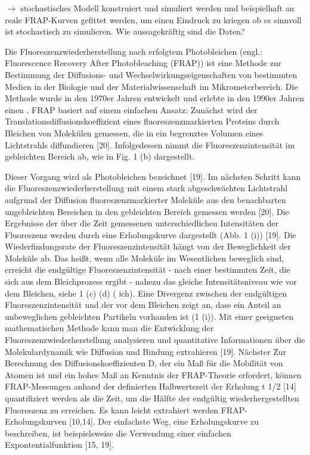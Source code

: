 $\rightarrow$ stochastisches Modell konstruiert und simuliert werden und beispielhaft an reale FRAP-Kurven gefittet werden, um einen Eindruck zu kriegen ob es sinnvoll ist stochastisch zu simulieren. Wie aussagekräftig sind die Daten?
\newline
\par
Die Fluoreszenzwiederherstellung nach erfolgtem Photobleichen (engl.: Fluorescence Recovery After Photobleaching (FRAP)) ist
eine Methode zur Bestimmung der Diffusions- und Wechselwirkungseigenschaften von bestimmten Medien in der Biologie und
der Materialwissenschaft im Mikrometerbereich.
Die Methode wurde in den 1970er Jahren entwickelt und erlebte in den 1990er Jahren einen .
FRAP basiert auf einem einfachen Ansatz:
Zunächst wird der Translationsdiffusionskoeffizient eines fluoreszenzmarkierten Proteins durch Bleichen von Molekülen gemessen,
die in ein begrenztes Volumen eines Lichtstrahls diffundieren [20]. Infolgedessen nimmt die Fluoreszenzintensität im gebleichten
Bereich ab, wie in Fig. 1 (b) dargestellt.\par
Dieser Vorgang wird als Photobleichen bezeichnet [19]. Im nächsten Schritt kann die Fluoreszenzwiederherstellung mit einem stark
abgeschwächten Lichtstrahl aufgrund der Diffusion fluoreszenzmarkierter Moleküle aus den benachbarten ungebleichten Bereichen in
den gebleichten Bereich gemessen werden [20]. Die Ergebnisse der über die Zeit gemessenen unterschiedlichen Intensitäten der
Fluoreszenz werden durch eine Erholungskurve dargestellt (Abb. 1 (i)) [19]. Die Wiederfindungsrate der Fluoreszenzintensität
hängt von der Beweglichkeit der Moleküle ab. Das heißt, wenn alle Moleküle im Wesentlichen beweglich sind, erreicht die endgültige
Fluoreszenzintensität - nach einer bestimmten Zeit, die sich aus dem Bleichprozess ergibt - nahezu das gleiche Intensitätsniveau
wie vor dem Bleichen, siehe 1 (c) (d) ( ich). Eine Divergenz zwischen der endgültigen Fluoreszenzintensität und der vor dem
Bleichen zeigt an, dass ein Anteil an unbeweglichen gebleichten Partikeln vorhanden ist (1 (i)). Mit einer geeigneten
mathematischen Methode kann man die Entwicklung der Fluoreszenzwiederherstellung analysieren und quantitative Informationen über
die Molekulardynamik wie Diffusion und Bindung extrahieren [19]. Nächster Zur Berechnung des Diffusionskoeffizienten D, der ein
Maß für die Mobilität von Atomen ist und ein hohes Maß an Kenntnis der FRAP-Theorie erfordert, können FRAP-Messungen anhand der
definierten Halbwertszeit der Erholung t 1/2 [14] quantifiziert werden als die Zeit, um die Hälfte der endgültig
wiederhergestellten Fluoreszenz zu erreichen. Es kann leicht extrahiert werden FRAP-Erholungskurven [10,14]. Der einfachste Weg,
eine Erholungskurve zu beschreiben, ist beispielsweise die Verwendung einer einfachen Expontentialfunktion [15, 19].


